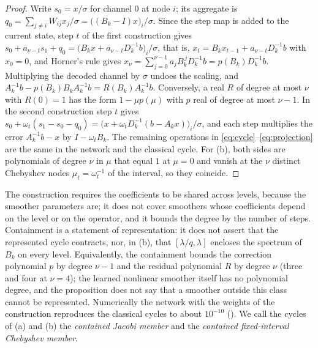 \begin{proof}
Write $s_0 = x/\sigma$ for channel $0$ at node $i$; its aggregate is $q_0 = \sum_{j\ne i}W_{ij}x_j/\sigma = \big((B_k - I)x\big)_i/\sigma$.
Since the step map is added to the current state, step $t$ of the first construction gives
$s_0 + a_{\nu-t}s_1 + q_0 = \big(B_kx + a_{\nu-t}D_k^{-1}b\big)_i/\sigma$, that is, $x_t = B_kx_{t-1} + a_{\nu-t}D_k^{-1}b$ with
$x_0 = 0$, and Horner's rule gives $x_\nu = \sum_{j=0}^{\nu-1}a_jB_k^{\,j}D_k^{-1}b = p(B_k)D_k^{-1}b$. Multiplying the decoded
channel by $\sigma$ undoes the scaling, and $A_k^{-1}b - p(B_k)B_kA_k^{-1}b = R(B_k)A_k^{-1}b$. Conversely, a real $R$ of degree
at most $\nu$ with $R(0) = 1$ has the form $1-\mu p(\mu)$ with $p$ real of degree at most $\nu-1$. In the second construction
step $t$ gives $s_0 + \omega_t(s_1 - s_0 - q_0) = \big(x + \omega_t D_k^{-1}(b - A_k x)\big)_i/\sigma$, and each step multiplies the
error $A_k^{-1}b - x$ by $I-\omega_tB_k$. The remaining operations in \eqref{eq:cycle}--\eqref{eq:projection} are the same in
the network and the classical cycle. For (b), both sides are polynomials of degree $\nu$ in $\mu$ that equal $1$ at $\mu = 0$
and vanish at the $\nu$ distinct Chebyshev nodes $\mu_t = \omega_t^{-1}$ of the interval, so they coincide.
\end{proof}
The construction requires the coefficients to be shared across levels, because the smoother parameters are; it does not
cover smoothers whose coefficients depend on the level or on the operator, and it bounds the degree by the number of steps.
Containment is a statement of representation: it does not assert that the represented cycle contracts, nor, in (b), that
$[\lambda/q,\lambda]$ encloses the spectrum of $B_k$ on every level. Equivalently, the containment bounds the correction polynomial $p$ by degree $\nu-1$ and the residual polynomial $R$ by
degree $\nu$ (three and four at $\nu = 4$); the learned nonlinear smoother itself has no polynomial degree, and the
proposition does not say that a smoother outside this class cannot be represented. Numerically the network with the weights
of the construction reproduces the classical cycles to about $10^{-10}$ (). We call the cycles of (a) and (b) the \emph{contained Jacobi
member} and the \emph{contained fixed-interval Chebyshev member}.


